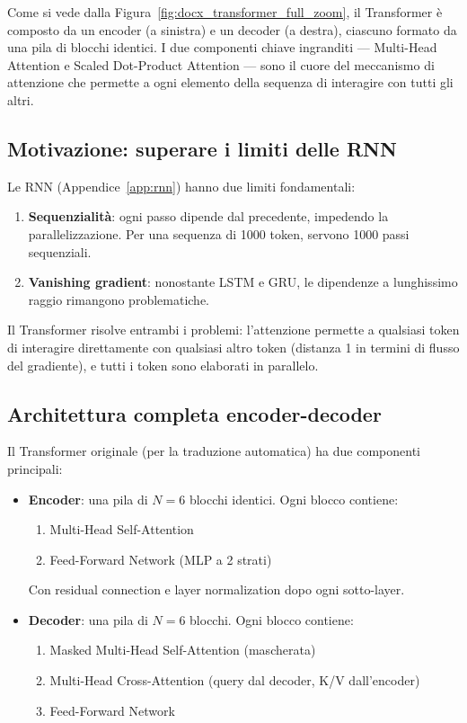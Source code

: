 \documentclass[12pt,a4paper]{article}
\begin{document}
Come si vede dalla Figura~\ref{fig:docx_transformer_full_zoom}, il Transformer \`e composto da un encoder (a sinistra) e un decoder (a destra), ciascuno formato da una pila di blocchi identici. I due componenti chiave ingranditi --- Multi-Head Attention e Scaled Dot-Product Attention --- sono il cuore del meccanismo di attenzione che permette a ogni elemento della sequenza di interagire con tutti gli altri.

\subsection{Motivazione: superare i limiti delle RNN}

Le RNN (Appendice~\ref{app:rnn}) hanno due limiti fondamentali:
\begin{enumerate}
    \item \textbf{Sequenzialit\`a}: ogni passo dipende dal precedente, impedendo la parallelizzazione. Per una sequenza di 1000 token, servono 1000 passi sequenziali.
    \item \textbf{Vanishing gradient}: nonostante LSTM e GRU, le dipendenze a lunghissimo raggio rimangono problematiche.
\end{enumerate}

Il Transformer risolve entrambi i problemi: l'attenzione permette a qualsiasi token di interagire direttamente con qualsiasi altro token (distanza 1 in termini di flusso del gradiente), e tutti i token sono elaborati in parallelo.


\subsection{Architettura completa encoder-decoder}

Il Transformer originale (per la traduzione automatica) ha due componenti principali:

\begin{itemize}
    \item \textbf{Encoder}: una pila di $N = 6$ blocchi identici. Ogni blocco contiene:
    \begin{enumerate}
        \item Multi-Head Self-Attention
        \item Feed-Forward Network (MLP a 2 strati)
    \end{enumerate}
    Con residual connection e layer normalization dopo ogni sotto-layer.

    \item \textbf{Decoder}: una pila di $N = 6$ blocchi. Ogni blocco contiene:
    \begin{enumerate}
        \item Masked Multi-Head Self-Attention (mascherata)
        \item Multi-Head Cross-Attention (query dal decoder, K/V dall'encoder)
        \item Feed-Forward Network
    \end{enumerate}
\end{itemize}
\end{document}

